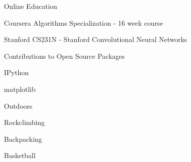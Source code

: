 \begin{cventries}
  \cventry
    {}
    {Online Education}
    {}
    {}
    {
      \begin{cvitems}
        \item {Coursera Algorithms Specialization - 16 week course}
        \item {Stanford CS231N - Stanford Convolutional Neural Networks}
      \end{cvitems}
    }
  \cventry
    {}
    {Contributions to Open Source Packages}
    {}
    {}
    {
      \begin{cvitems}
        \item {IPython}
        \item {matplotlib}
      \end{cvitems}
    }
  \cventry
    {}
    {Outdoors}
    {}
    {}
    {
      \begin{cvitems}
        \item {Rockclimbing}
        \item {Backpacking}
        \item {Basketball}
      \end{cvitems}
    }
\end{cventries}
